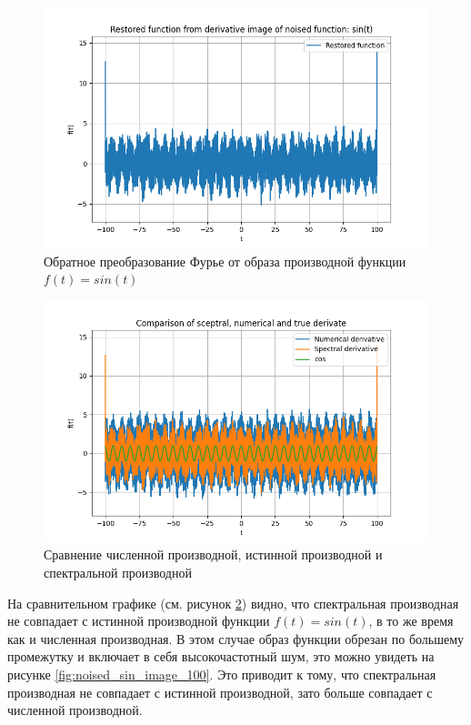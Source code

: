 \begin{figure}[ht!]
    \centering
    \includegraphics[width=\textwidth]{../results/100/noised_sin_image_derivative_restored.png}
    \caption{Обратное преобразование Фурье от образа производной функции $f(t) = sin(t)$}
    \label{fig:noised_sin_image_deriviate_restored_100}
\end{figure}

\begin{figure}[ht!]
    \centering
    \includegraphics[width=\textwidth]{../results/100/derivative_cmp.png}
    \caption{Сравнение численной производной, истинной производной и спектральной производной}
    \label{fig:derivative_cmp_100}
\end{figure}

\FloatBarrier
На сравнительном графике (см. рисунок \ref{fig:derivative_cmp_100}) видно, что спектральная производная не совпадает с истинной производной функции $f(t) = sin(t)$, в то же время как и численная производная.
В этом случае образ функции обрезан по большему промежутку и включает в себя высокочастотный шум, это можно увидеть на рисунке \ref{fig:noised_sin_image_100}. Это приводит к тому, 
что спектральная производная не совпадает с истинной производной, зато больше совпадает с численной производной. 
